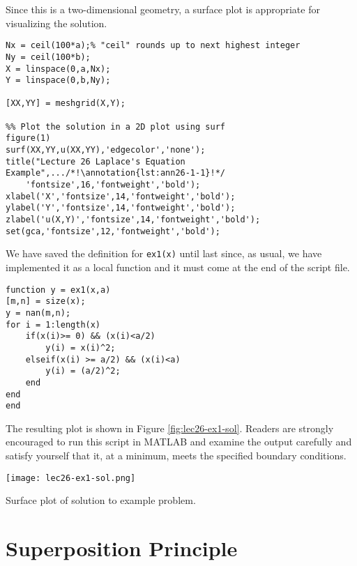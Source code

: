 \noindent Since this is a two-dimensional geometry, a surface plot is appropriate for visualizing the solution.

\begin{lstlisting}[name=lec26-ex1, style=myMatlab]
%% Make discrete spatial coordinate axes
Nx = ceil(100*a);% "ceil" rounds up to next highest integer
Ny = ceil(100*b);
X = linspace(0,a,Nx);
Y = linspace(0,b,Ny);

[XX,YY] = meshgrid(X,Y);

%% Plot the solution in a 2D plot using surf
figure(1)
surf(XX,YY,u(XX,YY),'edgecolor','none');
title("Lecture 26 Laplace's Equation Example",.../*!\annotation{lst:ann26-1-1}!*/
    'fontsize',16,'fontweight','bold');
xlabel('X','fontsize',14,'fontweight','bold');
ylabel('Y','fontsize',14,'fontweight','bold');
zlabel('u(X,Y)','fontsize',14,'fontweight','bold');
set(gca,'fontsize',12,'fontweight','bold');
\end{lstlisting}
We have saved the definition for \lstinline[style=myMatlab]{ex1(x)} until last since, as usual, we have implemented it as a local function and it must come at the end of the script file.

\begin{lstlisting}[name=lec26-ex1,style=myMatlab]
%% Local functions
function y = ex1(x,a)
[m,n] = size(x);
y = nan(m,n);
for i = 1:length(x)
    if(x(i)>= 0) && (x(i)<a/2)
        y(i) = x(i)^2;
    elseif(x(i) >= a/2) && (x(i)<a)
        y(i) = (a/2)^2;
    end
end    
end
\end{lstlisting}
The resulting plot is shown in Figure \ref{fig:lec26-ex1-sol}.  Readers are strongly encouraged to run this script in MATLAB and examine the output carefully and satisfy yourself that it, at a minimum, meets the specified boundary conditions.
\begin{marginfigure}
\texttt{[image: lec26-ex1-sol.png]}
\caption{Surface plot of solution to example problem.}
\label{fig:lec26-ex1-sol}
\end{marginfigure}

\section{Superposition Principle}

